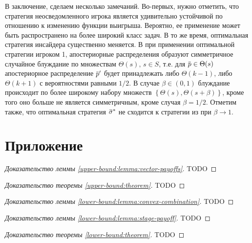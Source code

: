 \documentclass[12pt, draft]{extarticle}
\newcommand{\overbar}[1]%
{\mkern 1.5mu\overline{\mkern-1.3mu#1\mkern-1.3mu}\mkern 1.3mu}
\newcommand{\p}{\ensuremath{\overbar{p}}}
\newcommand{\sigmav}{\ensuremath{\overbar{\sigma}}}
\begin{document}
В заключение, сделаем несколько замечаний. Во-первых, нужно отметить, что
стратегия неосведомленного игрока является удивительно устойчивой по отношению к
изменению функции выигрыша. Вероятно, ее применение может быть распространено на
более широкий класс задач. В то же время, оптимальная стратегия инсайдера
существенно меняется. В \cite{bib:domansky11} при применении оптимальной
стратегии игроком 1, апостериорные распределения образуют симметричное случайное
блуждание по множествам $\Theta(s), \, s \in S$, т.е. для $\p \in \Theta(s)$
апостериорное распределение $\p'$ будет принадлежать либо $\Theta(k-1)$, либо
$\Theta(k+1)$ с вероятностями равными $1/2$. В случае $\beta \in (0, 1)$
блуждание происходит по более широкому набору множеств %
$\left\{ \Theta(s), \Theta(s+\beta) \right\}$, %
кроме того оно больше не является симметричным, кроме случая $\beta = 1/2$.
Отметим также, что оптимальная стратегия $\sigmav^*$ не сходится к стратегии из
\cite{bib:domansky11} при $\beta \rightarrow 1$.

\appendix
\setcounter{secnumdepth}{0}
\section{Приложение}

\begin{proof}[Доказательство леммы \ref{upper-bound:lemma:vector-payoffs}]
  TODO
\end{proof}

\begin{proof}[Доказательство теоремы \ref{upper-bound:theorem}]
  TODO
\end{proof}

\begin{proof}[Доказательство леммы \ref{lower-bound:lemma:convex-combination}]
  TODO
\end{proof}

\begin{proof}[Доказательство леммы \ref{lower-bound:lemma:stage-payoff}]
  TODO
\end{proof}

\begin{proof}[Доказательство теоремы \ref{lower-bound:theorem}]
  TODO
\end{proof}
\end{document}
